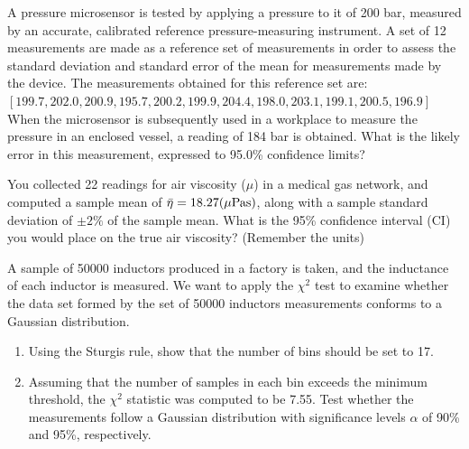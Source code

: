 \documentclass[a4paper,11pt,dvipsnames]{book}
\begin{document}
\begin{question}
A pressure microsensor is tested by applying a pressure to it of 200 bar, measured by an accurate, calibrated reference pressure-measuring instrument. A set of 12 measurements are made as a reference set of measurements in order to assess the standard deviation and standard error of the mean for measurements made by the device. The measurements obtained for this reference set are: \\
$\left[199.7, 202.0, 200.9, 195.7, 200.2, 199.9, 204.4, 198.0, 203.1, 199.1,  200.5, 196.9\right]$ \\

When the microsensor is subsequently used in a workplace to measure the pressure in an enclosed vessel, a reading of 184 bar is obtained. What is the likely error in this measurement, expressed to
95.0\% confidence limits?

\examspace*{10em}

\end{question}
\begin{solution}


\end{solution}

\begin{question}
You collected 22 readings for air viscosity ($\mu$) in a medical gas network, and computed a sample mean
of $\rm \bar{\eta} = 18.27 ( \rm \mu Pa s)$, along with a sample standard deviation of $\pm 2\%$ of the sample mean. What is the 95\% confidence interval (CI) you would place on the true air viscosity? (Remember the units)

\examspace*{10em}

\end{question}
\begin{solution}

\end{solution}

\begin{question}
A sample of 50000 inductors produced in a factory is taken, and the inductance of each inductor is measured. We want to apply the ${\chi}^2$ test to examine whether the data set formed by the set of 50000
inductors measurements conforms to a Gaussian distribution.
\begin{enumerate}
\item Using the Sturgis rule, show that the number of bins should be set to 17.
\item Assuming that the number of samples in each bin exceeds the minimum threshold, the ${\chi}^2$  statistic was computed to be 7.55. Test whether the measurements follow a Gaussian distribution with significance levels $\alpha$ of 90\% and 95\%, respectively.
\end{enumerate}
\examspace*{10em}

\end{question}
\begin{solution}

\end{solution}
\end{document}
